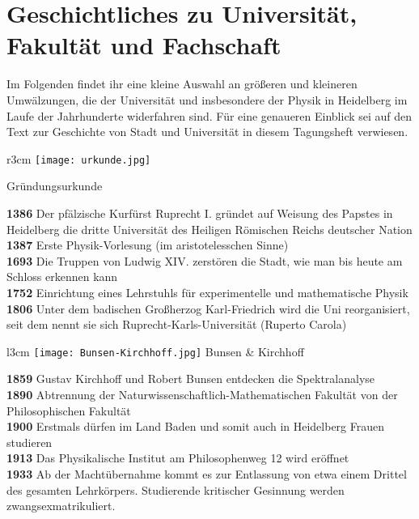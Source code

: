 
\section[Geschichtliches]{Geschichtliches zu Universität, Fakultät und Fachschaft}

Im Folgenden findet ihr eine kleine Auswahl an größeren und kleineren Umwälzungen, die der Universität und insbesondere der Physik in Heidelberg im Laufe der Jahrhunderte widerfahren sind. Für eine genaueren Einblick sei auf den Text zur Geschichte von Stadt und Universität in diesem Tagungsheft verwiesen.

\begin{wrapfigure}[]{r}{3cm}
\vspace{-13pt}
\texttt{[image: urkunde.jpg]}

\small{Gründungsurkunde}
\end{wrapfigure}

\textbf{1386} Der pfälzische Kurfürst Ruprecht I. gründet auf Weisung des Papstes in Heidelberg die dritte Universität des Heiligen Römischen Reichs deutscher Nation\\
\textbf{1387}  Erste Physik-Vorlesung (im aristotelesschen Sinne)\\
\textbf{1693} Die Truppen von Ludwig XIV. zerstören die Stadt, wie man bis heute am Schloss erkennen kann\\
\textbf{1752} Einrichtung eines Lehrstuhls für experimentelle und mathematische Physik\\
\textbf{1806} Unter dem badischen Großherzog Karl-Friedrich wird die Uni reorganisiert, seit dem nennt sie sich Ruprecht-Karls-Universität (Ruperto Carola)

\begin{wrapfigure}{l}{3cm}
\vspace{-13pt}
\texttt{[image: Bunsen-Kirchhoff.jpg]}
\small{Bunsen \& Kirchhoff}
\vspace{-13pt}
\end{wrapfigure}

\textbf{1859} Gustav Kirchhoff und Robert Bunsen entdecken die Spektralanalyse\\
\textbf{1890} Abtrennung der Naturwissenschaftlich-Mathematischen Fakultät von der Philosophischen Fakultät\\
\textbf{1900} Erstmals dürfen im Land Baden und somit auch in Heidelberg Frauen studieren\\
\textbf{1913} Das Physikalische Institut am Philosophenweg 12 wird eröffnet\\
\textbf{1933} Ab der Machtübernahme kommt es zur Entlassung von etwa einem Drittel des gesamten Lehrkörpers. Studierende kritischer Gesinnung werden zwangsexmatrikuliert. 

